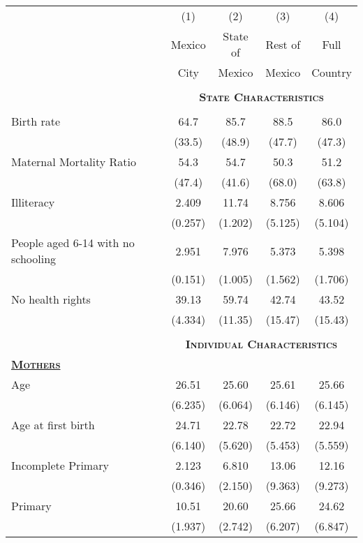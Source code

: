 {\small 	\begin{tabular}{lcccc}\toprule\toprule
		& (1) & (2) & (3) & (4) \\ 
  	& Mexico & State of & Rest of & Full \\ 
 	&City&Mexico&Mexico&Country \\ 
	
	
	\hline &&&&\\
		 \multirow{1}{*}{} &
		 \multicolumn{4}{c}{\textbf{\textsc{State Characteristics}} }\\\cline{2-5}
	 &&&&\\
 Birth rate & 64.7&85.7 &88.5 &86.0\\
 &(33.5)&(48.9)&(47.7)&(47.3) \\
	Maternal Mortality Ratio &  54.3&54.7 &50.3 &51.2\\
	 &(47.4)&(41.6)&(68.0)&(63.8) \\
	Illiteracy      &       2.409&       11.74&       8.756&       8.606\\
	&     (0.257)&     (1.202)&     (5.125)&     (5.104)\\
	
	People aged 6-14 with no schooling   &       2.951&       7.976&       5.373&       5.398\\
	&     (0.151)&     (1.005)&     (1.562)&     (1.706)\\
	
	No health rights    &       39.13&       59.74&       42.74&       43.52\\
	&     (4.334)&     (11.35)&     (15.47)&     (15.43)\\
 

	 &&&&\\
			 \multirow{1}{*}{} &
			 \multicolumn{4}{c}{\textbf{\textsc{Individual Characteristics}} }\\\cline{2-5}
 	\textbf{\textsc{\underline{Mothers}}}	&&&&\\
 	  
 	  Age & 26.51& 25.60&25.61 &25.66\\
 		&(6.235)&(6.064)&(6.146)&(6.145)\\
 	  Age at first birth& 24.71& 22.78& 22.72& 22.94  \\
 		&(6.140)&(5.620)&(5.453)&(5.559)\\
 		 
 	 
  Incomplete Primary&       2.123&       6.810&       13.06&       12.16\\
	&     (0.346)&     (2.150)&     (9.363)&     (9.273)\\
  Primary&       10.51&       20.60&       25.66&       24.62\\
	&     (1.937)&     (2.742)&     (6.207)&     (6.847)\\
 

\end{tabular}}
